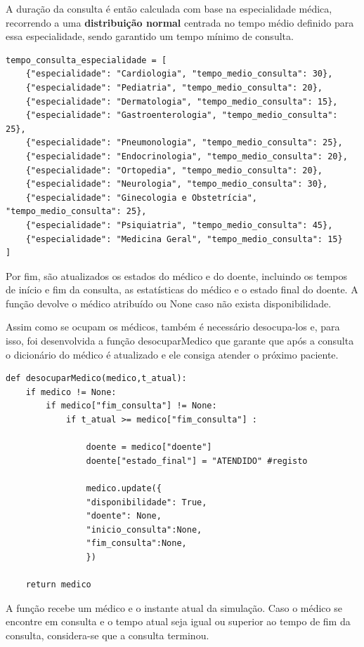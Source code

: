 \documentclass[12pt,a4paper]{article} %
\begin{document}
    A duração da consulta é então calculada com base na especialidade médica, recorrendo a uma \textbf{distribuição normal} centrada no tempo médio definido para essa especialidade, sendo garantido um tempo mínimo de consulta.

\begin{verbatim}
tempo_consulta_especialidade = [
    {"especialidade": "Cardiologia", "tempo_medio_consulta": 30},
    {"especialidade": "Pediatria", "tempo_medio_consulta": 20},
    {"especialidade": "Dermatologia", "tempo_medio_consulta": 15},
    {"especialidade": "Gastroenterologia", "tempo_medio_consulta": 25},
    {"especialidade": "Pneumonologia", "tempo_medio_consulta": 25},
    {"especialidade": "Endocrinologia", "tempo_medio_consulta": 20},
    {"especialidade": "Ortopedia", "tempo_medio_consulta": 20},
    {"especialidade": "Neurologia", "tempo_medio_consulta": 30},
    {"especialidade": "Ginecologia e Obstetrícia", "tempo_medio_consulta": 25},
    {"especialidade": "Psiquiatria", "tempo_medio_consulta": 45},
    {"especialidade": "Medicina Geral", "tempo_medio_consulta": 15}
]
\end{verbatim}

    Por fim, são atualizados os estados do médico e do doente, incluindo os tempos de início e fim da consulta, as estatísticas do médico e o estado final do doente. A função devolve o médico atribuído ou None caso não exista disponibilidade.

    Assim como se ocupam os médicos, também é necessário desocupa-los e, para isso, foi desenvolvida a função desocuparMedico que garante que após a consulta o dicionário do médico é atualizado e ele consiga atender o próximo paciente. 

\hypertarget{desocupa_medico}{}
\begin{verbatim}
def desocuparMedico(medico,t_atual):
    if medico != None:
        if medico["fim_consulta"] != None:
            if t_atual >= medico["fim_consulta"] :

                doente = medico["doente"]
                doente["estado_final"] = "ATENDIDO" #registo

                medico.update({
                "disponibilidade": True,
                "doente": None,
                "inicio_consulta":None,
                "fim_consulta":None,
                })

    return medico
\end{verbatim}

    A função recebe um médico e o instante atual da simulação. Caso o médico se encontre em consulta e o tempo atual seja igual ou superior ao tempo de fim da consulta, considera-se que a consulta terminou.
\end{document}
